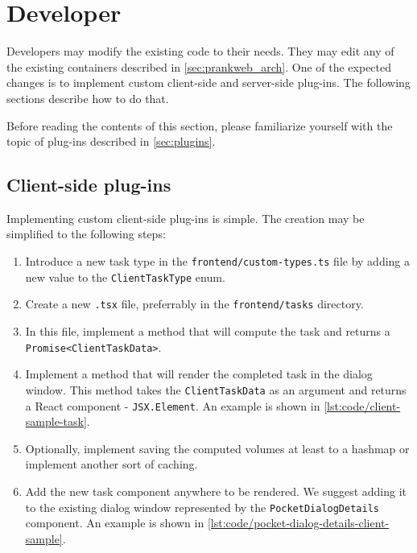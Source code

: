 \section{Developer}
\label{sec:developer}

Developers may modify the existing code to their needs. They may edit any of the existing containers described in \cref{sec:prankweb_arch}. One of the expected changes is to implement custom client-side and server-side plug-ins. The following sections describe how to do that.

Before reading the contents of this section, please familiarize yourself with the topic of plug-ins described in \cref{sec:plugins}.

\subsection{Client-side plug-ins}
\label{subsec:dev_client_side}

Implementing custom client-side plug-ins is simple. The creation may be simplified to the following steps:

\begin{enumerate}
    \item Introduce a new task type in the \texttt{frontend/custom-types.ts} file by adding a new value to the \texttt{ClientTaskType} enum.
    \item Create a new \texttt{.tsx} file, preferrably in the \texttt{frontend/tasks} directory.
    \item In this file, implement a method that will compute the task and returns a \texttt{Promise<ClientTaskData>}.
    \item Implement a method that will render the completed task in the dialog window. This method takes the \texttt{ClientTaskData} as an argument and returns a React component - \texttt{JSX.Element}. An example is shown in \cref{lst:code/client-sample-task}.
    \item Optionally, implement saving the computed volumes at least to a hashmap or implement another sort of caching.
    \item Add the new task component anywhere to be rendered. We suggest adding it to the existing dialog window represented by the \texttt{PocketDialogDetails} component. An example is shown in \cref{lst:code/pocket-dialog-details-client-sample}.
\end{enumerate}



